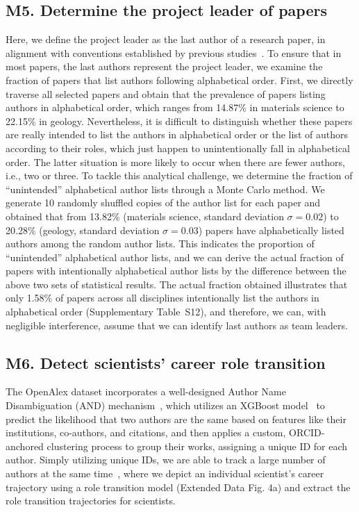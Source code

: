 \subsection*{M5. Determine the project leader of papers}
Here, we define the project leader as the last author of a research paper, in alignment with conventions established by previous studies~\supercite{sekara2018chaperone}.
To ensure that in most papers, the last authors represent the project leader, we examine the fraction of papers that list authors following alphabetical order.
First, we directly traverse all selected papers and obtain that the prevalence of papers listing authors in alphabetical order, which ranges from 14.87\% in materials science to 22.15\% in geology.
Nevertheless, it is difficult to distinguish whether these papers are really intended to list the authors in alphabetical order or the list of authors according to their roles, which just happen to unintentionally fall in alphabetical order. The latter situation is more likely to occur when there are fewer authors, i.e., two or three.
To tackle this analytical challenge, we determine the fraction of “unintended” alphabetical author lists through a Monte Carlo method.
We generate 10 randomly shuffled copies of the author list for each paper and obtained that from 13.82\% (materials science, standard deviation $\sigma=0.02$) to 20.28\% (geology, standard deviation $\sigma=0.03$) papers have alphabetically listed authors among the random author lists.
This indicates the proportion of “unintended” alphabetical author lists, and we can derive the actual fraction of papers with intentionally alphabetical author lists by the difference between the above two sets of statistical results.
The actual fraction obtained illustrates that only 1.58\% of papers across all disciplines intentionally list the authors in alphabetical order (Supplementary Table~S12), and therefore, we can, with negligible interference, assume that we can identify last authors as team leaders.

\subsection*{M6. Detect scientists’ career role transition}
The OpenAlex dataset incorporates a well-designed Author Name Disambiguation (AND) mechanism~\supercite{openalex}, which utilizes an XGBoost model~\supercite{chen2016xgboost} to predict the likelihood that two authors are the same based on features like their institutions, co-authors, and citations, and then applies a custom, ORCID-anchored clustering process to group their works, assigning a unique ID for each author.
Simply utilizing unique IDs, we are able to track a large number of authors at the same time~\supercite{hill2025pivot}, where we depict an individual scientist’s career trajectory using a role transition model (Extended Data Fig. 4a) and extract the role transition trajectories for scientists.

